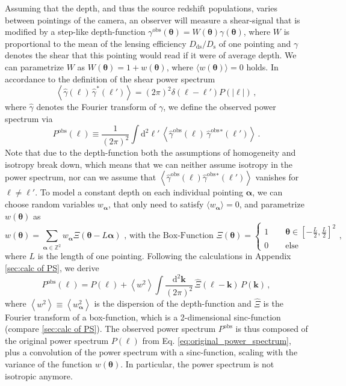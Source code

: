 \documentclass[referee]{aa} %
\renewcommand{\[}{\begin{equation}}
\renewcommand{\]}{\end{equation}}
\renewcommand{\rm}{\mathrm}
\def\b#1{\bm{#1}}
\def\Dds{D_{\rm{ds}}}
\def\Ds{D_{\rm{s}}}
\def\la{\left<}
\def\ra{\right>}
\def\gammao{\gamma^{\text{obs}}}
\def\gammaoh{\hat{\gamma}^{\text{obs}}}
\def\d{\rm{d}}
\begin{document}
Assuming that the depth, and thus the source redshift populations, varies between pointings of the camera, an observer will measure a shear-signal that is modified by a step-like depth-function $\gammao(\b\theta)=W(\b \theta)\gamma(\b\theta)$, where $W$ is proportional to the mean of the lensing efficiency $\Dds/\Ds$ of one pointing and $\gamma$ denotes the shear that this pointing would read if it were of average depth.
We can parametrize $W$ as $W(\bm{\theta}) = 1+w(\bm{\theta})$, where $\langle w(\bm{\theta})\rangle=0$ holds. 
In accordance to the definition of the shear power spectrum \begin{equation}
\la \hat{\gamma}(\b\ell)\,\hat{\gamma}^*(\b\ell')\ra = (2\pi)^2\delta(\b\ell-\b\ell')P(|\b\ell|) \, ,
\label{eq:original_power_spectrum}
\end{equation}
where $\hat{\gamma}$ denotes the Fourier transform of $\gamma$, we define the observed power spectrum via \begin{equation}
P^{\text{obs}}(\b\ell) \equiv \frac{1}{(2\pi)^2}\int \d^2 \ell'\,  \la \gammaoh(\b \ell)\, \gammaoh {}^*(\b \ell')\ra \, .
\end{equation}
Note that due to the depth-function both the assumptions of homogeneity and isotropy break down, which means that we can neither assume isotropy in the power spectrum, nor can we assume that $\la \gammaoh(\b \ell) \gammaoh {}^*(\b \ell')\ra$ vanishes for $\b\ell\neq\b\ell'$.
To model a constant depth on each individual pointing $\b \alpha$, we can choose random variables $w_{\b \alpha}$, that only need to satisfy $\langle w_{\b \alpha}\rangle=0$, and parametrize $w(\b\theta)$ as 
\begin{equation}
w(\b \theta) = \sum_{\b \alpha \in \mathbb{Z}^2} w_{\b \alpha} \Xi(\b \theta-L\b \alpha)\text{ , with the Box-Function } \Xi(\b \theta) = \begin{cases}
1 \qquad \b \theta\in \left[-\frac{L}{2},\frac{L}{2}\right]^2 \\
0 \qquad \text{else}
\end{cases},
\label{eq:defweightf}
\end{equation}
where $L$ is the length of one pointing.
Following the calculations in Appendix \ref{sec:calc of PS}, we derive 
\begin{equation}
P^{\text{obs}}(\b \ell)  =  P(\b \ell) + \la w^2\ra \int\frac{\text{d}^2\b k}{(2\pi)^2}\,\hat{\Xi}(\b \ell-\b k)\, P(\b k)\, ,
\end{equation}
where $\la w^2\ra \equiv \la w_{\b \alpha}^2\ra$ is the dispersion of the depth-function and $\hat{\Xi}$ is the Fourier transform of a box-function, which is a 2-dimensional sinc-function (compare \ref{sec:calc of PS}).
The observed power spectrum $P^{\text{obs}}$ is thus composed of the original power spectrum $P(\ell)$ from Eq. \eqref{eq:original_power_spectrum}, plus a convolution of the power spectrum with a sinc-function, scaling with the variance of the function $w(\b\theta)$. In particular, the power spectrum is not isotropic anymore.
\end{document}
